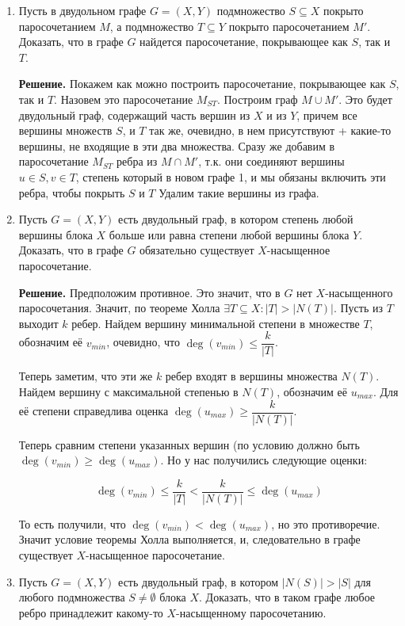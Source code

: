 \documentclass[fleqn]{article}
\begin{document}
	\begin{enumerate}
	\item Пусть в двудольном графе $G = (X, Y)$ подмножество $S \subseteq X$ покрыто паросочетанием $M$, а подмножество $T \subseteq Y$ покрыто паросочетанием $M'$. Доказать, что в графе $G$ найдется паросочетание, покрывающее как $S$, так и $T$.
	
	\textbf{Решение.} Покажем как можно построить паросочетание, покрывающее как $S$, так и $T$. Назовем это паросочетание $M_{ST}$. Построим граф $M \cup M'$. Это будет двудольный граф, содержащий часть вершин из $X$ и из $Y$, причем все вершины множеств $S$, и $T$ так же, очевидно, в нем присутствуют + какие-то вершины, не входящие в эти два множества. Сразу же добавим в паросочетание $M_{ST}$ ребра из $M\cap M'$, т.к. они соединяют вершины $u \in S, v \in T$, степень который в новом графе 1, и мы обязаны включить эти ребра, чтобы покрыть $S$ и $T$ Удалим такие вершины из графа. 
	 
	
	\item Пусть $G = (X, Y)$ есть двудольный граф, в котором степень любой вершины блока $X$ больше или равна степени любой вершины блока $Y$. Доказать, что в графе $G$ обязательно существует $X$-насыщенное паросочетание.
	
	\textbf{Решение.} Предположим противное. Это значит, что в $G$ нет $X$-насыщенного паросочетания. Значит, по теореме Холла $\exists T \subseteq X : |T| > |N(T)|$. Пусть из $T$ выходит $k$ ребер. Найдем вершину минимальной степени в множестве $T$, обозначим её $v_{min}$, очевидно, что $\deg(v_{min}) \leqslant \dfrac{k}{|T|}$.
	
	Теперь заметим, что эти же $k$ ребер входят в вершины множества $N(T)$. Найдем вершину с максимальной степенью в $N(T)$, обозначим её $u_{max}$. Для её степени справедлива оценка $\deg(u_{max}) \geqslant \dfrac{k}{|N(T)|}$.
	
	Теперь сравним степени указанных вершин (по условию должно быть $\deg(v_{min}) \geqslant \deg(u_{max})$. Но у нас получились следующие оценки:
	
	$$\deg(v_{min}) \leqslant \frac{k}{|T|} < \frac{k}{|N(T)|} \leqslant \deg(u_{max})$$
	
	То есть получили, что $\deg(v_{min}) < \deg(u_{max})$, но это противоречие. Значит условие теоремы Холла выполняется, и, следовательно в графе существует $X$-насыщенное паросочетание.
	
	\item Пусть $G = (X, Y)$ есть двудольный граф, в котором $|N(S)| > |S|$ для любого подмножества $S \neq \emptyset$	блока $X$. Доказать, что в таком графе любое ребро принадлежит какому-то $X$-насыщенному паросочетанию.
	

\end{enumerate}
\end{document}
